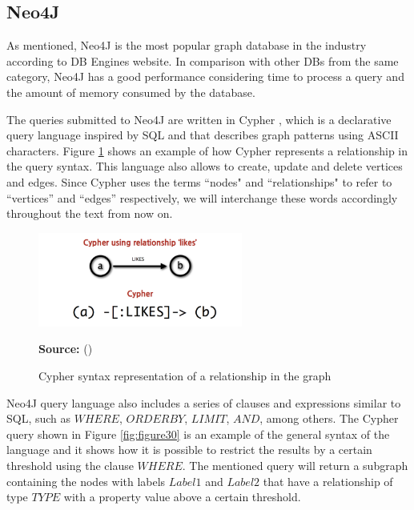 \subsection{Neo4J}

As mentioned, Neo4J is the most popular graph database in the industry according to DB Engines website. In comparison with other DBs from the same category, Neo4J has a good performance considering time to process a query and the amount of memory consumed by the database.

The queries submitted to Neo4J are written in Cypher \cite{Neo4jCypher}, which is a declarative query language inspired by SQL and that describes graph patterns using ASCII characters. Figure \ref{fig:figure29} shows an example of how Cypher represents a relationship in the query syntax. This language also allows to create, update and delete vertices and edges. Since Cypher uses the terms ``nodes" and ``relationships" to refer to ``vertices'' and ``edges'' respectively, we will interchange these words accordingly throughout the text from now on.

\begin{figure}[ht]
\centering
\caption{Cypher syntax representation of a relationship in the graph}
\label{fig:figure29}
\includegraphics[width=0.6\textwidth]{images/cypher_pattern_simple.png}
\par\medskip\ABNTEXfontereduzida\selectfont\textbf{Source:} \citeauthor{Neo4jCypher} (\citeyear{Neo4jCypher}) \par\medskip
\end{figure}

Neo4J query language also includes a series of clauses and expressions similar to SQL, such as  $WHERE$, $ORDER BY$, $LIMIT$, $AND$, among others. The Cypher query shown in Figure \ref{fig:figure30} is an example of the general syntax of the language and it shows how it is possible to restrict the results by a certain threshold using the clause $WHERE$. The mentioned query will return a subgraph containing the nodes with labels $Label1$ and $Label2$ that have a relationship of type $TYPE$ with a property value above a certain threshold.

